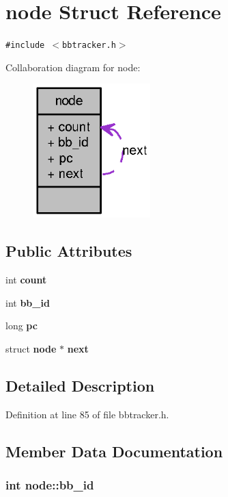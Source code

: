 \section{node Struct Reference}
\label{structnode}
{\tt \#include $<$bbtracker.h$>$}

Collaboration diagram for node:\nopagebreak
\begin{figure}[H]
\begin{center}
\leavevmode
\includegraphics[width=129pt]{structnode__coll__graph}
\end{center}
\end{figure}
\subsection*{Public Attributes}
\begin{CompactItemize}
\item 
int {\bf count}
\item 
int {\bf bb\_\-id}
\item 
long {\bf pc}
\item 
struct {\bf node} $\ast$ {\bf next}
\end{CompactItemize}


\subsection{Detailed Description}


Definition at line 85 of file bbtracker.h.

\subsection{Member Data Documentation}
\subsubsection[{bb\_\-id}]{\setlength{\rightskip}{0pt plus 5cm}int {\bf node::bb\_\-id}}\label{structnode_f8b174bf25144314c1caa4728ddb5013}




